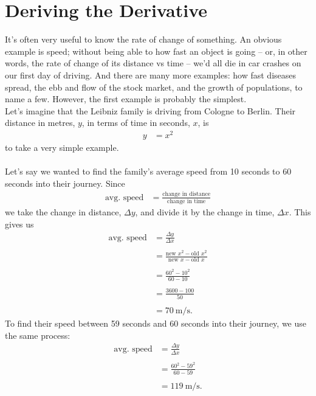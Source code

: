 \documentclass[11pt]{article}
\numberwithin{equation}{section}
\begin{document}
\newpage
\section{Deriving the Derivative}
It's often very useful to know the rate of change of something. An obvious example is speed; without being able to how fast an object is going -- or, in other words, the rate of change of its distance vs time -- we'd all die in car crashes on our first day of driving. And there are many more examples: how fast diseases spread, the ebb and flow of the stock market, and the growth of populations, to name a few. However, the first example is probably the simplest.
\\ Let's imagine that the Leibniz family is driving from Cologne to Berlin. Their distance in metres, \(y\), in terms of time in seconds, \(x\), is
\begin{align*}
y &= x^2
\end{align*}
to take a very simple example. 
\\ \\ Let's say we wanted to find the family's average speed from 10 seconds to 60 seconds into their journey. Since
\begin{align*}
\textrm{avg. speed} &= \frac{\textrm{change in distance}}{\textrm{change in time}}
\end{align*}
we take the change in distance, \(\Delta y\), and divide it by the change in time, \(\Delta x\). This gives us
\begin{align*}
\textrm{avg. speed} &= \frac{\Delta y}{\Delta x} \\ \\
&= \frac{\textrm{new } x^2 - \textrm{old } x^2}{\textrm{new } x - \textrm{old } x} \\ \\
&= \frac{60^2 - 10^2}{60 - 10} \\ \\
&= \frac{3600 - 100}{50} \\  \\
&= 70 \ \textrm{m/s}.
\end{align*}
To find their speed between 59 seconds and 60 seconds into their journey, we use the same process:
\begin{align*}
\textrm{avg. speed} &= \frac{\Delta y}{\Delta x} \\ \\
&= \frac{60^2 - 59^2}{60 - 59} \\ \\
&= 119 \ \textrm{m/s}.
\end{align*}
\end{document}
